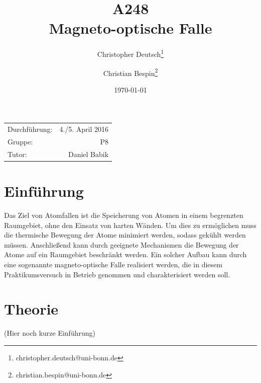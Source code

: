\documentclass[11pt, a4paper]{article}
\title{A248 \\ Magneto-optische Falle}
\author{Christopher Deutsch\footnote{christopher.deutsch@uni-bonn.de} \and Christian Bespin\footnote{christian.bespin@uni-bonn.de}}
\date{\today}
\numberwithin{equation}{section}
\newcommand{\korr}[1]{{\color{red}(#1)}}
\begin{document}
\begin{titlepage}

\maketitle

\begin{center}
\begin{tabular}{l r}
Durchführung: & 4./5. April 2016 \\
Gruppe: & P8 \\
Tutor: & Daniel Babik
\end{tabular}
\end{center}

\begin{abstract}
\noindent
\end{abstract}

\end{titlepage}

\tableofcontents
\newpage

\section{Einführung}

Das Ziel von Atomfallen ist die Speicherung von Atomen in einem begrenzten Raumgebiet, ohne den Einsatz von harten Wänden.
Um dies zu ermöglichen muss die thermische Bewegung der Atome minimiert werden, sodass gekühlt werden müssen.
Anschließend kann durch geeignete Mechanismen die Bewegung der Atome auf ein Raumgebiet beschränkt werden.
Ein solcher Aufbau kann durch eine sogenannte magneto-optische Falle realisiert werden, die in diesem Praktikumsversuch in Betrieb genommen und charakterisiert werden soll.

\section{Theorie}

\korr{Hier noch kurze Einführung}
\end{document}
